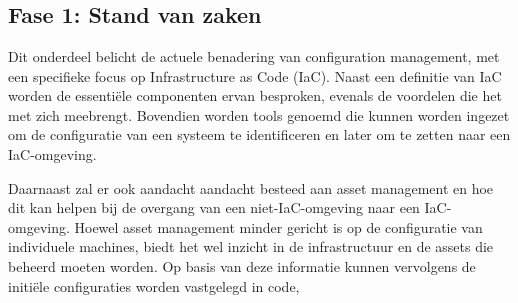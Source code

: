 
\chapter{}%
\label{ch:methodologie}


\section{Fase 1: Stand van zaken}
\label{sec:fase-1-stand-van-zaken}

Dit onderdeel belicht de actuele benadering van configuration management, met een specifieke focus op Infrastructure as Code (IaC).
Naast een definitie van IaC worden de essentiële componenten ervan besproken, evenals de voordelen die het met zich meebrengt.
Bovendien worden tools genoemd die kunnen worden ingezet om de configuratie van een systeem te identificeren en later om te zetten naar een IaC-omgeving.

Daarnaast zal er ook aandacht aandacht besteed aan asset management en hoe dit kan helpen bij de overgang van een niet-IaC-omgeving naar een IaC-omgeving.
Hoewel asset management minder gericht is op de configuratie van individuele machines, biedt het wel inzicht in de infrastructuur en de assets die beheerd moeten worden.
Op basis van deze informatie kunnen vervolgens de initiële configuraties worden vastgelegd in code,

